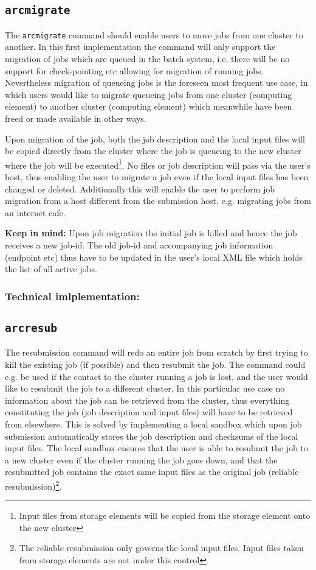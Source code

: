\documentclass[12pt,oneside,a4paper,english]{article}
\begin{document}
\subsection*{\texttt{arcmigrate}}
The \texttt{arcmigrate} command should enable users to move jobs from one cluster to another. In this first implementation the command will only support the migration of jobs which are queued in the batch system, i.e. there will be no support for check-pointing etc allowing for migration of running jobs. Nevertheless migration of queueing jobs is the foreseen most frequent use case, in which users would like to migrate queueing jobs from one cluster (computing element) to another cluster (computing element) which meanwhile have been freed or made available in other ways. 

Upon migration of the job, both the job description and the local input files will be copied directly from the cluster where the job is queueing to the new cluster where the job will be executed\footnote{Input files from storage elements will be copied from the storage element onto the new cluster}. No files or job description will pass via the user's host, thus enabling the user to migrate a job even if the local input files has been changed or deleted. Additionally this will enable the user to perform job migration from a host different from the submission host, e.g. migrating jobs from an internet cafe.

{\bf Keep in mind:} Upon job migration the initial job is killed and hence the job receives a new job-id. The old job-id and accompanying job information (endpoint etc) thus have to be updated in the user's local XML file which holds the list of all active jobs.

\subsubsection*{Technical imlplementation:}

\subsection*{\texttt{arcresub}}
The resubmission command will redo an entire job from scratch by first trying to kill the existing job (if possible) and then resubmit the job. The command could e.g. be used if the contact to the cluster running a job is lost, and the user would like to resubmit the job to a different cluster. In this particular use case no information about the job can be retrieved from the cluster, thus everything constituting the job (job description and input files) will have to be retrieved from elsewhere. This is solved by implementing a local sandbox which upon job submission automatically stores the job description and checksums of the local input files. The local sandbox ensures that the user is able to resubmit the job to a new cluster even if the cluster running the job goes down, and that the resubmitted job contains the exact same input files as the original job (reliable resubmission)\footnote{The reliable resubmission only governs the local input files. Input files taken from storage elements are not under this control}. 
\end{document}
